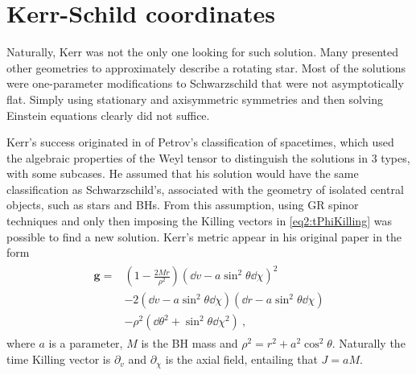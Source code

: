 
\section{Kerr-Schild coordinates}

Naturally, Kerr was not the only one looking for such solution.
Many presented other geometries to approximately describe a rotating star. 
Most of the solutions were one-parameter modifications to Schwarzschild that were not asymptotically flat. 
Simply using stationary and axisymmetric symmetries and then solving Einstein equations clearly did not suffice.

Kerr's success originated in of Petrov's classification of spacetimes, which used the algebraic properties of the Weyl tensor to distinguish the solutions in 3 types, with some subcases.
He assumed that his solution would have the same classification as Schwarzschild's, associated with the geometry of isolated central objects, such as stars and BHs. 
From this assumption, using GR spinor techniques and only then imposing the Killing vectors in \eqref{eq2:tPhiKilling} was possible to find a new solution. 
Kerr's metric appear in his original paper \cite{Kerr1963} in the form
\begin{align}
    \begin{split}
        \bm{g} = & \left(1 - \frac{2 M r}{\rho^2} \right) (\dd v - a \sin^2\theta \dd \chi )^2 \\
        & - 2  (\dd v - a \sin^2\theta \dd \chi )  (\dd r - a \sin^2\theta \dd \chi ) \\
        & - \rho^2 (\dd \theta^2 + \sin^2\theta \dd \chi^2 ) ~,
    \end{split}
    \label{eq2:KerrIngoingEF}
\end{align}
where $a$ is a parameter, $M$ is the BH mass and $\rho^2 = r^2 + a^2 \cos^2\theta$. Naturally the time Killing vector is $\partial_v$ and $\partial_\chi$ is the axial field, entailing that $J = a M$.

